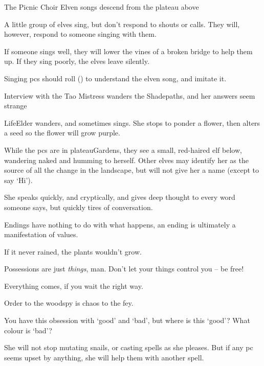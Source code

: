 
{The Picnic Choir}%
{Elven songs descend from the plateau above}%

A little group of elves sing, but don't respond to shouts or calls.
They will, however, respond to someone singing with them.

If someone sings well, they will lower the vines of a broken bridge to help them up.
If they sing poorly, the elves leave silently.

Singing \glspl{pc} should roll  (\tn[10]) to understand the elven song, and imitate it.

{Interview with the Tao Mistress}%
{ wanders the Shadepaths, and her answers seem strange}%

\Gls{LifeElder} wanders, and sometimes sings.
She stops to ponder a flower, then alters a seed so the flower will grow purple.

While the \glspl{pc} are in \gls{plateauGardens}, they see a small, red-haired elf below, wandering naked and humming to herself.
Other elves may identify her as the source of all the change in the landscape, but will not give her a name (except to say `Hi').

She speaks quickly, and cryptically, and gives deep thought to every word someone says, but quickly tires of conversation.

\begin{speechtext}
  Endings have nothing to do with what happens, an ending is ultimately a manifestation of values.

  If it never rained, the plants wouldn't grow.

  Possessions are just \emph{things}, man.
  Don't let your things control you -- be free!

  Everything comes, if you wait the right way.

  Order to the \gls{woodspy} is chaos to the fey.

  You have this obsession with `good' and `bad', but where is this `good'?
  What colour is `bad'?

\end{speechtext}

She will not stop mutating snails, or casting spells as she pleases.
But if any \gls{pc} seems upset by anything, she will help them with another spell.

